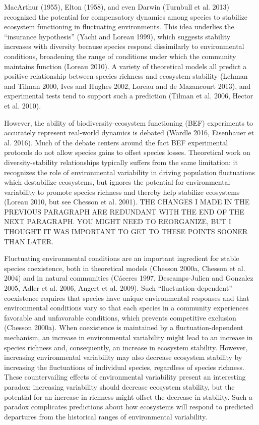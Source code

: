 \documentclass[12pt,]{article}
\begin{document}
MacArthur (1955), Elton (1958), and even Darwin (Turnbull et al. 2013)
recognized the potential for compensatory dynamics among species to
stabilize ecosystem functioning in fluctuating environments. This idea
underlies the ``insurance hypothesis'' (Yachi and Loreau 1999), which
suggests stability increases with diversity because species respond
dissimilarly to environmental conditions, broadening the range of
conditions under which the community maintains function (Loreau 2010). A
variety of theoretical models all predict a positive relationship
between species richness and ecosystem stability (Lehman and Tilman
2000, Ives and Hughes 2002, Loreau and {{de Mazancourt}} 2013), and
experimental tests tend to support such a prediction (Tilman et al.
2006, Hector et al. 2010).

However, the ability of biodiversity-ecosystem functioning (BEF)
experiments to accurately represent real-world dynamics is debated
(Wardle 2016, Eisenhauer et al. 2016). Much of the debate centers around
the fact BEF experimental protocols do not allow species gains to offset
species losses. Theoretical work on diversity-stability relationships
typically suffers from the same limitation: it recognizes the role of
environmental variability in driving population fluctuations which
destabilize ecosystems, but ignores the potential for environmental
variability to promote species richness and thereby help stabilize
ecosystems (Loreau 2010, but see Chesson et al. 2001). THE CHANGES I
MADE IN THE PREVIOUS PARAGRAPH ARE REDUNDANT WITH THE END OF THE NEXT
PARAGRAPH. YOU MIGHT NEED TO REORGANIZE, BUT I THOUGHT IT WAS IMPORTANT
TO GET TO THESE POINTS SOONER THAN LATER.

Fluctuating environmental conditions are an important ingredient for
stable species coexistence, both in theoretical models (Chesson 2000a,
Chesson et al. 2004) and in natural communities (C{á}ceres 1997,
Descamps-Julien and Gonzalez 2005, Adler et al. 2006, Angert et al.
2009). Such ``fluctuation-dependent'' coexistence requires that species
have unique environmental responses and that environmental conditions
vary so that each species in a community experiences favorable and
unfavorable conditions, which prevents competitive exclusion (Chesson
2000a). When coexistence is maintained by a fluctuation-dependent
mechanism, an increase in environmental variability might lead to an
increase in species richness and, consequently, an increase in ecosystem
stability. However, increasing environmental variability may also
decrease ecosystem stability by increasing the fluctuations of
individual species, regardless of species richness. These countervailing
effects of environmental variability present an interesting paradox:
increasing variability should decrease ecosystem stability, but the
potential for an increase in richness might offset the decrease in
stability. Such a paradox complicates predictions about how ecosystems
will respond to predicted departures from the historical ranges of
environmental variability.
\end{document}
